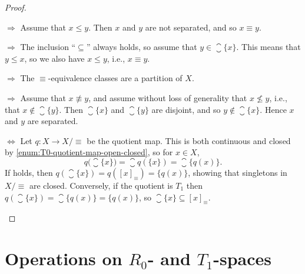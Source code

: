 \documentclass[article, a4paper, 11pt, oneside]{memoir}
\numberwithin{equation}{chapter}
\renewcommand{\implies}{\Rightarrow}
\renewcommand{\iff}{\Leftrightarrow}
\begin{document}
\begin{proof}
\begin{proofsec}
    \item[\subcref{enum:R0-space} $\implies$ \subcref{enum:R0-specialisation-preorder-symmetric}]
    Assume that $x \leq y$. Then $x$ and $y$ are not separated, and so $x \equiv y$.

    \item[\subcref{enum:R0-specialisation-preorder-symmetric} $\implies$ \subcref{enum:R0-closure-of-point}]
    The inclusion \enquote{$\subseteq$} always holds, so assume that $y \in \closure{\{x\}}$. This means that $y \leq x$, so we also have $x \leq y$, i.e., $x \equiv y$.
    
    \item[\subcref{enum:R0-closure-of-point} $\implies$ \subcref{enum:R0-partition}]
    The $\equiv$-equivalence classes are a partition of $X$.
    
    \item[\subcref{enum:R0-partition} $\implies$ \subcref{enum:R0-space}]
    Assume that $x \not\equiv y$, and assume without loss of generality that $x \not\leq y$, i.e., that $x \not\in \closure{\{y\}}$. Then $\closure{\{x\}}$ and $\closure{\{y\}}$ are disjoint, and so $y \not\in \closure{\{x\}}$. Hence $x$ and $y$ are separated.

    \item[\subcref{enum:R0-closure-of-point} $\iff$ \subcref{enum:R0-quotient-is-T1}]
    Let $q \colon X \to X/{\equiv}$ be the quotient map. This is both continuous and closed by \cref{enum:T0-quotient-map-open-closed}, so for $x \in X$,
    \begin{equation*}
        q\bigl( \closure{\{x\}} \bigr)
            = \closure{q(\{x\})}
            = \closure{\{q(x)\}}.
    \end{equation*}
    If  holds, then $q(\closure{\{x\}}) = q([x]_\equiv) = \{q(x)\}$, showing that singletons in $X/{\equiv}$ are closed. Conversely, if the quotient is $T_1$ then $q(\closure{\{x\}}) = \closure{\{q(x)\}} = \{q(x)\}$, so $\closure{\{x\}} \subseteq [x]_\equiv$.
\end{proofsec}
\end{proof}



\section[Operations on R0- and T1-spaces][Operations on $R_0$- and $T_1$-spaces]{Operations on $R_0$- and $T_1$-spaces}
\end{document}
